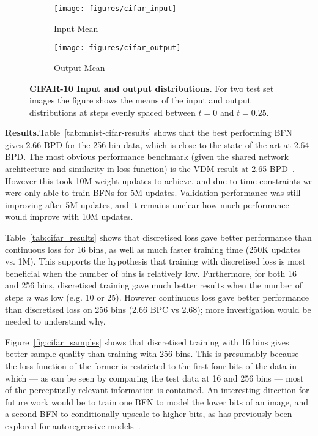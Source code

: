 \documentclass[11pt,table]{article}
\newcommand{\0}[1]{\constvec{0}{#1}}
\newcommand{\1}[1]{\constvec{1}{#1}}
\begin{document}
\begin{figure}[t!]
\centering
\begin{subfigure}{\textwidth}
    \centering
    \texttt{[image: figures/cifar\_input]}
    \caption{Input Mean}
\end{subfigure}
\par\bigskip
\begin{subfigure}{\textwidth}
    \centering
    \texttt{[image: figures/cifar\_output]}
    \caption{Output Mean}
\end{subfigure}
\caption{\textbf{CIFAR-10 Input and output distributions}. For two test set images the figure shows the means of the input and output distributions at steps evenly spaced between $t=0$ and $t=0.25$. }
\end{figure}

\noindent\textbf{Results.}\quad Table~\ref{tab:mnist-cifar-results} shows that the best performing BFN gives 2.66 BPD for the 256 bin data, which is close to the state-of-the-art at 2.64 BPD.
The most obvious performance benchmark (given the shared network architecture and similarity in loss function) is the VDM result at 2.65 BPD~\citep{kingma2021variational}.
However this took 10M weight updates to achieve, and due to time constraints we were only able to train BFNs for 5M updates.
Validation performance was still improving after 5M updates, and it remains unclear how much performance would improve with 10M updates.

Table~\ref{tab:cifar_results} shows that discretised loss gave better performance than continuous loss for 16 bins, as well as much faster training time (250K updates vs. 1M).
This supports the hypothesis that training with discretised loss is most beneficial when the number of bins is relatively low.
Furthermore, for both 16 and 256 bins, discretised training gave much better results when the number of steps $n$ was low (e.g. 10 or 25).
However continuous loss gave better performance than discretised loss on 256 bins (2.66 BPC vs 2.68); more investigation would be needed to understand why.

Figure~\ref{fig:cifar_samples} shows that discretised training with 16 bins gives better sample quality than training with 256 bins.
This is presumably because the loss function of the former is restricted to the first four bits of the data in which --- as can be seen by comparing the test data at 16 and 256 bins --- most of the perceptually relevant information is contained.
An interesting direction for future work would be to train one BFN to model the lower bits of an image, and a second BFN to conditionally upscale to higher bits, as has previously been explored for autoregressive models~\citep{menick2018generating,hoogeboom2021autoregressive}.
\end{document}
